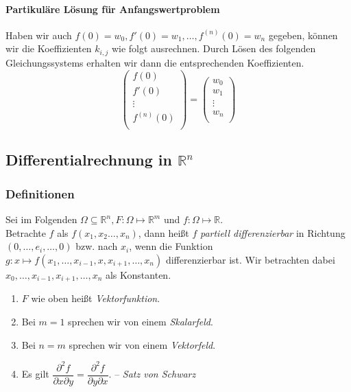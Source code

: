 \documentclass[a4paper, 9pt, DIV=24]{scrartcl}
\newcommand{\R}{\mathbb{R}}
\begin{document}
\paragraph{Partikuläre Lösung für Anfangswertproblem}
Haben wir auch $f(0) = w_0, f'(0) = w_1, \dots, f^{(n)}(0) = w_n$ gegeben,
können wir die Koeffizienten $k_{i,j}$ wie folgt ausrechnen.
Durch Lösen des folgenden Gleichungssystems erhalten wir dann die entsprechenden Koeffizienten.
\[
 \begin{pmatrix}
  f(0) \\
  f'(0) \\
  \vdots \\
  f^{(n)}(0) \\
 \end{pmatrix}
  =
 \begin{pmatrix}
  w_0 \\
  w_1 \\
  \vdots \\
  w_n \\
 \end{pmatrix}
\]

\clearpage
\subsection{Differentialrechnung in $\mathbb{R}^n$}
\subsubsection{Definitionen}
Sei im Folgenden $\Omega \subseteq \R^n, F: \Omega \mapsto \R^m$ und $f: \Omega \mapsto \R$. \\
Betrachte $f$ als $f(x_1,x_2\dots,x_n)$, dann heißt $f$ \emph{partiell differenzierbar} in Richtung $(0,\dots,e_i,\dots,0)$ bzw. nach $x_i$,
wenn die Funktion $g: x \mapsto f(x_1,\dots,x_{i-1},x,x_{i+1},\dots,x_n)$ differenzierbar ist. Wir betrachten dabei $x_0,\dots,x_{i-1},x_{i+1},\dots,x_n$ als Konstanten.

\begin{enumerate}[label={(}\arabic*{)}]
 \item $F$ wie oben heißt \emph{Vektorfunktion}.
 \item Bei $m = 1$ sprechen wir von einem \emph{Skalarfeld}.
 \item Bei $n = m$ sprechen wir von einem \emph{Vektorfeld}.
 \item Es gilt $\dfrac{\partial^2 f}{\partial x\partial y} = \dfrac{\partial^2 f}{\partial y\partial x}$. -- \emph{Satz von Schwarz}
\end{enumerate}
\end{document}
